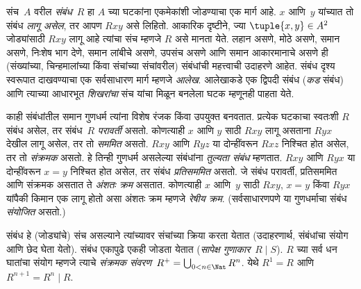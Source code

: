 संच~$A$ वरील \emph{संबंध}~$R$ हा $A$ च्या घटकांना एकमेकांशी जोडण्याचा एक मार्ग आहे. $x$ आणि~$y$ यांच्यात तो संबंध \emph{लागू असेल}, तर आपण $Rxy$ असे लिहितो. आकारिक दृष्टीने, ज्या $\tuple{x,y} \in A^2$ जोड्यांसाठी $Rxy$ लागू आहे त्यांचा संच म्हणजे $R$ असे मानता येते. लहान असणे, मोठे असणे, समान असणे, निःशेष भाग देणे, समान लांबीचे असणे, उपसंच असणे आणि समान आकारमानाचे असणे ही (संख्यांच्या, चिन्हमालांच्या किंवा संचांच्या संचांवरील) संबंधांची महत्त्वाची उदाहरणे आहेत. संबंध दृश्य स्वरूपात दाखवण्याचा एक सर्वसाधारण मार्ग म्हणजे \emph{आलेख}. आलेखाकडे एक द्विपदी संबंध (\emph{कड} संबंध) आणि त्याच्या आधारभूत \emph{शिखरांचा} संच यांचा मिळून बनलेला घटक म्हणूनही पाहता येते.

काही संबंधांतील समान गुणधर्म त्यांना विशेष रंजक किंवा उपयुक्त बनवतात. प्रत्येक घटकाचा स्वतःशी $R$ संबंध असेल, तर संबंध~$R$ \emph{परावर्ती} असतो. कोणत्याही $x$ आणि $y$ साठी $Rxy$ लागू असताना $Ryx$ देखील लागू असेल, तर तो \emph{सममित} असतो. $Rxy$ आणि $Ryz$ या दोन्हींवरून $Rxz$ निश्चित होत असेल, तर तो \emph{संक्रमक} असतो. हे तिन्ही गुणधर्म असलेल्या संबंधांना \emph{तुल्यता संबंध} म्हणतात. $Rxy$ आणि $Ryx$ या दोन्हींवरून $x=y$ निश्चित होत असेल, तर संबंध \emph{प्रतिसममित} असतो. जे संबंध परावर्ती, प्रतिसममित आणि संक्रमक असतात ते \emph{अंशतः क्रम} असतात. कोणत्याही $x$ आणि~$y$ साठी $Rxy$, $x=y$ किंवा $Ryx$ यांपैकी किमान एक लागू होतो असा अंशतः क्रम म्हणजे \emph{रेषीय क्रम}. (सर्वसाधारणपणे या गुणधर्माचा संबंध \emph{संयोजित} असतो.)

संबंध हे (जोड्यांचे) संच असल्याने त्यांच्यावर संचांच्या क्रिया करता येतात (उदाहरणार्थ, संबंधांचा संयोग आणि छेद घेता येतो). संबंध एकापुढे एकही जोडता येतात (\emph{सापेक्ष गुणाकार}~$R \mid S$). $R$ च्या सर्व धन घातांचा संयोग म्हणजे त्याचे \emph{संक्रमक संवरण}~$R^+ = \bigcup_{0 < n \in \Nat} R^n$. येथे $R^1 = R$ आणि $R^{n+1} = R^n \mid R$.
